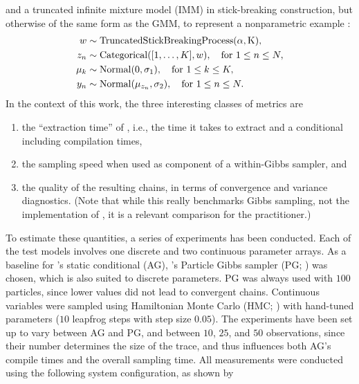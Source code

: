 and a truncated infinite mixture model (IMM) in stick-breaking construction, but otherwise of the
same form as the GMM, to represent a nonparametric example \parencite[section
2.2]{hjort2010bayesian}:
\begin{equation}
  \label{eq:imm}
  \begin{aligned}
    w &\sim \mathrm{TruncatedStickBreakingProcess(\alpha, K)}, \\
    z_{n} &\sim \mathrm{Categorical}([1, \ldots, K], w), \quad\text{for } 1 \le n \le N, \\
    \mu_{k} &\sim \mathrm{Normal}(0, \sigma_{1}), \quad\text{for } 1 \le k \le K, \\
    y_{n} &\sim \mathrm{Normal}(\mu_{z_{n}}, \sigma_{2}), \quad\text{for } 1 \le n \le N.
  \end{aligned}
\end{equation}
In the context of this work, the three interesting classes of metrics are
\begin{enumerate}
  \firmlist
\item the \enquote{extraction time} of \autogibbsjl{}, i.e., the time it takes to extract and a
  conditional including compilation times,
\item the sampling speed when used as component of a within-Gibbs sampler, and
\item the quality of the resulting chains, in terms of convergence and variance diagnostics.  (Note
  that while this really benchmarks Gibbs sampling, not the implementation of \autogibbsjl{}, it is
  a relevant comparison for the practitioner.)
\end{enumerate}
To estimate these quantities, a series of experiments has been conducted.  Each of the test models
involves one discrete and two continuous parameter arrays.  As a baseline for \autogibbsjl{}'s
static conditional (AG), \turingjl{}'s Particle Gibbs sampler (PG;
\textcite[see]{andrieu2010particlea}) was chosen, which is also suited to discrete parameters.  PG
was always used with \(100\) particles, since lower values did not lead to convergent chains.
Continuous variables were sampled using Hamiltonian Monte Carlo (HMC;
\textcite[see]{betancourt2018conceptual}) with hand-tuned parameters (\(10\) leapfrog steps with
step size \(0.05\)).  The experiments have been set up to vary between AG and PG, and between
\(10\), \(25\), and \(50\) observations, since their number determines the size of the trace, and
thus influences both AG's compile times and the overall sampling time.  All measurements were
conducted using the following system configuration, as shown by
